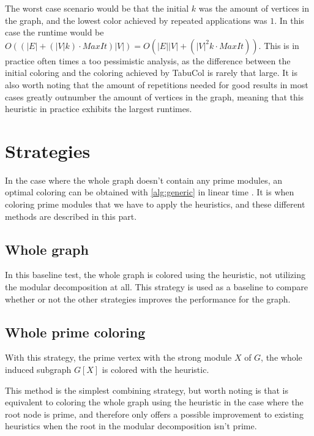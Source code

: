 \documentclass[a4paper]{article}
\begin{document}
The worst case scenario would be that the initial $k$ was the amount of
vertices in the graph, and the lowest color achieved by repeated applications
was $1$. In this case the runtime would be $O((|E|+(|V|k)\cdot MaxIt)|V|) = O(
|E||V| + (|V|^2k\cdot MaxIt))$. This is in practice often times a too
pessimistic analysis, as the difference between the initial coloring and the
coloring achieved by TabuCol is rarely that large. It is also worth noting that
the amount of repetitions needed for good results in most cases greatly
outnumber the amount of vertices in the graph, meaning that this heuristic in
practice exhibits the largest runtimes.

\section{Strategies}
\label{sec:Strategies}
In the case where the whole graph doesn't contain any prime modules, an optimal
coloring can be obtained with \autoref{alg:generic} in linear time
\cite{HCL}. It is when coloring prime modules that we have to apply the
heuristics, and these different methods are described in this part.

\subsection{Whole graph}

In this baseline test, the whole graph is colored using the heuristic, not
utilizing the modular decomposition at all. This strategy is used as a baseline
to compare whether or not the other strategies improves the performance for the
graph.

\subsection{Whole prime coloring}

With this strategy, the prime vertex with the strong module $X$ of $G$, the
whole induced subgraph $G[X]$ is colored with the heuristic.

This method is the simplest combining strategy, but worth noting is that is
equivalent to coloring the whole graph using the heuristic in the case where the
root node is prime, and therefore only offers a possible improvement to existing
heuristics when the root in the modular decomposition isn't prime.
\end{document}
